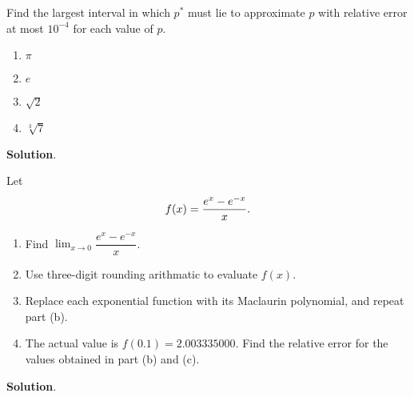 \documentclass[11pt]{article}
\theoremstyle{break}
\numberwithin{equation}{theorem}
\begin{document}
\begin{problem}
    Find the largest interval in which $p^\ast$ must lie to approximate $p$ with relative error at most $10^{-4}$ for each value of $p$.
    \begin{enumerate}
        \item $\pi$
        \item $e$
        \item $\sqrt{2}$
        \item $\sqrt[3]{7}$
    \end{enumerate}
\end{problem}
\textbf{Solution}.

\begin{problem}
    Let \vspace{-0.6em}
    \begin{equation*}
        f(x)=\dfrac{e^{x}-e^{-x}}{x}. \vspace{-0.6em}
    \end{equation*}
    \begin{enumerate}
        \item Find $\displaystyle\lim_{x\to 0}\dfrac{e^{x}-e^{-x}}{x}$.
        \item Use three-digit rounding arithmatic to evaluate $f(x)$.
        \item Replace each exponential function with its Maclaurin polynomial, and repeat part (b).
        \item The actual value is $f(0.1)=2.003335000$. Find the relative error for the values obtained in part (b) and (c).
    \end{enumerate}
\end{problem}
\textbf{Solution}.
\end{document}
